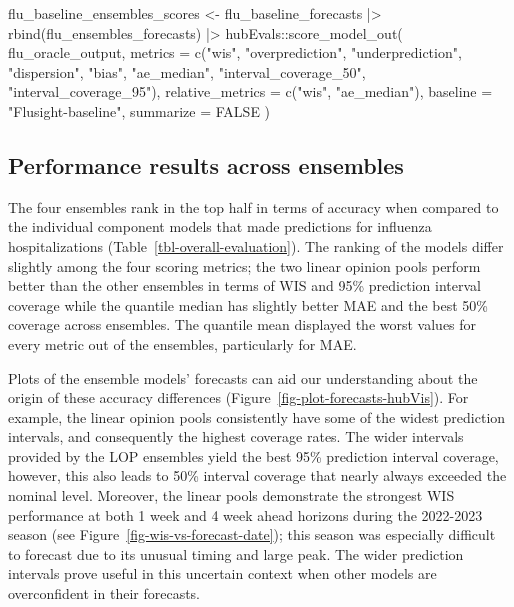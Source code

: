 \documentclass[
]{article}
\newenvironment{Shaded}{\begin{snugshade}}{\end{snugshade}}
\newcommand{\AttributeTok}[1]{\textcolor[rgb]{0.40,0.45,0.13}{#1}}
\newcommand{\ConstantTok}[1]{\textcolor[rgb]{0.56,0.35,0.01}{#1}}
\newcommand{\FunctionTok}[1]{\textcolor[rgb]{0.28,0.35,0.67}{#1}}
\newcommand{\NormalTok}[1]{\textcolor[rgb]{0.00,0.23,0.31}{#1}}
\newcommand{\OtherTok}[1]{\textcolor[rgb]{0.00,0.23,0.31}{#1}}
\newcommand{\SpecialCharTok}[1]{\textcolor[rgb]{0.37,0.37,0.37}{#1}}
\newcommand{\StringTok}[1]{\textcolor[rgb]{0.13,0.47,0.30}{#1}}
\begin{document}
\begin{Shaded}
\begin{Highlighting}[]
\NormalTok{flu\_baseline\_ensembles\_scores }\OtherTok{\textless{}{-}}\NormalTok{ flu\_baseline\_forecasts }\SpecialCharTok{|\textgreater{}}
  \FunctionTok{rbind}\NormalTok{(flu\_ensembles\_forecasts) }\SpecialCharTok{|\textgreater{}}
\NormalTok{  hubEvals}\SpecialCharTok{::}\FunctionTok{score\_model\_out}\NormalTok{(}
\NormalTok{    flu\_oracle\_output,}
    \AttributeTok{metrics =} \FunctionTok{c}\NormalTok{(}\StringTok{"wis"}\NormalTok{, }\StringTok{"overprediction"}\NormalTok{, }\StringTok{"underprediction"}\NormalTok{, }\StringTok{"dispersion"}\NormalTok{, }\StringTok{"bias"}\NormalTok{,}
                \StringTok{"ae\_median"}\NormalTok{, }\StringTok{"interval\_coverage\_50"}\NormalTok{, }\StringTok{"interval\_coverage\_95"}\NormalTok{),}
    \AttributeTok{relative\_metrics =} \FunctionTok{c}\NormalTok{(}\StringTok{"wis"}\NormalTok{, }\StringTok{"ae\_median"}\NormalTok{),}
    \AttributeTok{baseline =} \StringTok{"Flusight{-}baseline"}\NormalTok{,}
    \AttributeTok{summarize =} \ConstantTok{FALSE}
\NormalTok{  )}
\end{Highlighting}
\end{Shaded}

\subsection{Performance results across
ensembles}\label{performance-results-across-ensembles}

The four ensembles rank in the top half in terms of accuracy when
compared to the individual component models that made predictions for
influenza hospitalizations (Table~\ref{tbl-overall-evaluation}). The
ranking of the models differ slightly among the four scoring metrics;
the two linear opinion pools perform better than the other ensembles in
terms of WIS and 95\% prediction interval coverage while the quantile
median has slightly better MAE and the best 50\% coverage across
ensembles. The quantile mean displayed the worst values for every metric
out of the ensembles, particularly for MAE.

Plots of the ensemble models' forecasts can aid our understanding about
the origin of these accuracy differences
(Figure~\ref{fig-plot-forecasts-hubVis}). For example, the linear
opinion pools consistently have some of the widest prediction intervals,
and consequently the highest coverage rates. The wider intervals
provided by the LOP ensembles yield the best 95\% prediction interval
coverage, however, this also leads to 50\% interval coverage that nearly
always exceeded the nominal level. Moreover, the linear pools
demonstrate the strongest WIS performance at both 1 week and 4 week
ahead horizons during the 2022-2023 season (see
Figure~\ref{fig-wis-vs-forecast-date}); this season was especially
difficult to forecast due to its unusual timing and large peak. The
wider prediction intervals prove useful in this uncertain context when
other models are overconfident in their forecasts.
\end{document}
